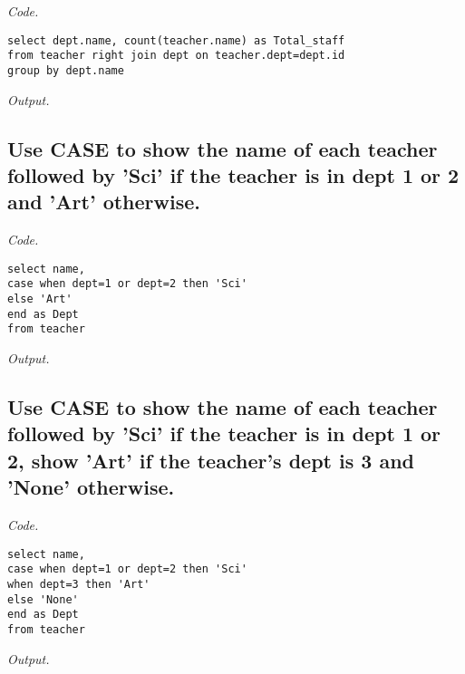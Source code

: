 \documentclass[12pt]{article}
\begin{document}
\textit{Code.}

\begin{lstlisting}[showstringspaces=false]
select dept.name, count(teacher.name) as Total_staff
from teacher right join dept on teacher.dept=dept.id
group by dept.name
\end{lstlisting}

\textit{Output.}\\

\subsection{Use CASE to show the name of each teacher followed by 'Sci' if the teacher is in dept 1 or 2 and 'Art' otherwise.}

\textit{Code.}

\begin{lstlisting}[showstringspaces=false]
select name,
case when dept=1 or dept=2 then 'Sci'
else 'Art'
end as Dept
from teacher
\end{lstlisting}

\textit{Output.}\\

\subsection{Use CASE to show the name of each teacher followed by 'Sci' if the teacher is in dept 1 or 2, show 'Art' if the teacher's dept is 3 and 'None' otherwise.}

\textit{Code.}

\begin{lstlisting}[showstringspaces=false]
select name,
case when dept=1 or dept=2 then 'Sci'
when dept=3 then 'Art'
else 'None'
end as Dept
from teacher
\end{lstlisting}

\textit{Output.}\\
\end{document}
